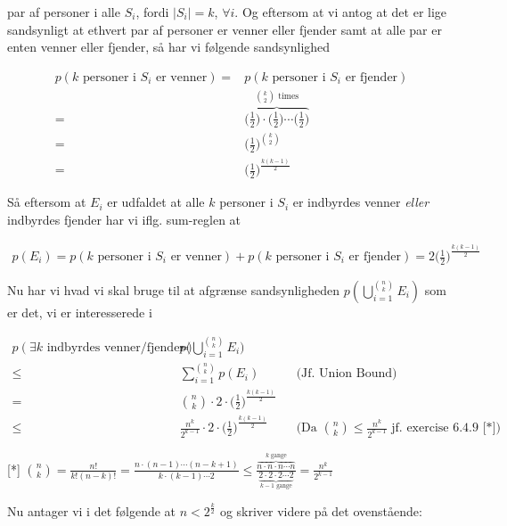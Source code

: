 \documentclass[12pt]{article}
\begin{document}
par af personer i alle $S_i$, fordi $|S_i|=k$, $\forall i$. Og eftersom at vi antog at det er lige sandsynligt at ethvert par af personer er venner eller fjender samt at alle par er enten venner eller fjender, så har vi følgende sandsynlighed 

\begin{align*}
    p(k \text{ personer i } S_i \text{ er venner}) =& p(k \text{ personer i } S_i \text{ er fjender}) \\
    =&\overbrace{\bigg( \frac{1}{2}\bigg) \cdot \bigg( \frac{1}{2} \bigg) \cdots \bigg( \frac{1}{2} \bigg)}^{\binom{k}{2} \text{ times}} \\
    =& \bigg( \frac{1}{2} \bigg)^{\binom{k}{2}} \\
    =& \bigg( \frac{1}{2}\bigg)^{\frac{k(k-1)}{2}}
\end{align*}

Så eftersom at $E_i$ er udfaldet at alle $k$ personer i $S_i$ er indbyrdes venner \textit{eller} indbyrdes fjender har vi iflg. sum-reglen at 

\begin{align*}
    p(E_i)=  p(k \text{ personer i } S_i \text{ er venner}) + p(k \text{ personer i } S_i \text{ er fjender}) = 2 \bigg(\frac{1}{2} \bigg)^{\frac{k(k-1)}{2}}
\end{align*}

Nu har vi hvad vi skal bruge til at afgrænse sandsynligheden $p(\bigcup_{i=1}^{\binom{n}{k}} E_i)$ som er det, vi er interesserede i 

\begin{align*}
    p(\exists k \text{ indbyrdes venner/fjender}) =& p\bigg( \bigcup_{i=1}^{\binom{n}{k}} E_i \bigg) \\
    \le& \sum_{i=1}^{\binom{n}{k}} p(E_i) &&\text{(Jf. Union Bound)} \\
    =&\binom{n}{k} \cdot 2 \cdot \bigg( \frac{1}{2}\bigg)^{\frac{k(k-1)}{2}} \\
    \le& \frac{n^k}{2^{k-1}} \cdot 2 \cdot \bigg( \frac{1}{2}\bigg)^{\frac{k(k-1)}{2}} && \text{(Da } \binom{n}{k} \le \frac{n^k}{2^{k-1}} \text{ jf. exercise 6.4.9 [*])} 
\end{align*}

[*] $\binom{n}{k} = \frac{n!}{k!(n-k)!} = \frac{n \cdot (n-1) \cdots (n-k+1)}{k \cdot (k-1) \cdots 2} \le \frac{\overbrace{n \cdot n \cdot n \cdots n}^{k \text{ gange}}}{\underbrace{2 \cdot 2 \cdot 2 \cdots 2}_{k-1 \text{ gange}}} = \frac{n^k}{2^{k-1}}$

Nu antager vi i det følgende at $n < 2^{\frac{k}{2}}$ og skriver videre på det ovenstående:
\end{document}

